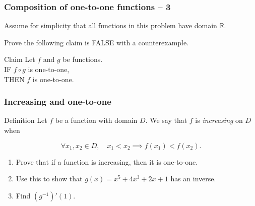 \documentclass[14pt]{beamer}
\begin{document}
	\begin{frame}[t]
		\frametitle{Composition of one-to-one functions -- 3}

		Assume for simplicity that all functions in this problem have domain
		$\mathbb{R}$.

		\vfill

		Prove the following claim is FALSE with a counterexample.

		\vfill

		\begin{block}{Claim }
			Let $f$ and $g$ be functions. \\ IF $f \circ g$ is one-to-one, \\ THEN $f$
			is one-to-one.
		\end{block}

		\vfill
	\end{frame}


	\begin{frame}[t]
		\frametitle{Increasing and one-to-one}

		\begin{block}{Definition}
			Let $f$ be a function with domain $D$. We say that $f$ is \emph{increasing}
			on $D$ when

			\[
				\forall x_{1}, x_{2}\in D, \quad x_{1}<x_{2}\implies f(x_{1})<f(x_{2}).
			\]
		\end{block}

		\begin{enumerate}
			\item Prove that if a function is increasing, then it is one-to-one.

			\item Use this to show that $g(x) = x^{5}+ 4x^{3}+ 2x + 1$ has an inverse.

			\item Find $(g^{-1})'(1)$.
		\end{enumerate}
	\end{frame}

\end{document}

